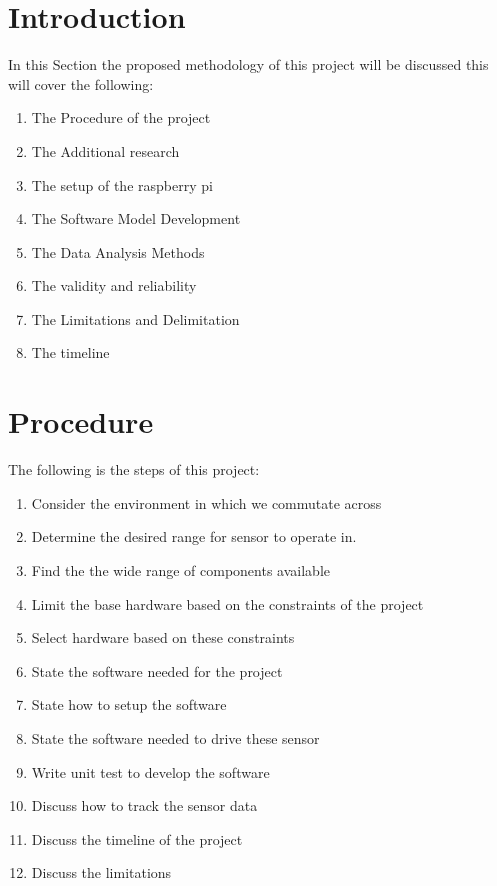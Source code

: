 
\section{Introduction}
In this  Section the  proposed  methodology of this  project will be discussed this will cover the  following:
\begin{enumerate}
    \item The Procedure of the project
    \item The Additional research
    \item The setup of the raspberry pi
    \item The Software Model Development
    \item The Data Analysis Methods
    \item The validity and reliability 
    \item The Limitations and Delimitation
    \item The timeline
\end{enumerate} 
\section{Procedure}
The following is the steps of this project:
\begin{enumerate}
    \item Consider the environment in which we commutate across
    \item Determine the desired  range  for sensor to operate in.
    \item Find the the wide range of components available
    \item Limit the base hardware based on the constraints of the project
    \item Select hardware based on these constraints
    \item State the software needed for the project
    \item State how to setup the software
    \item State the software needed to drive these sensor
    \item Write unit test to develop the software
    \item Discuss how to track the sensor data
    \item Discuss the timeline of the project
    \item Discuss the limitations 
  
\end{enumerate}
